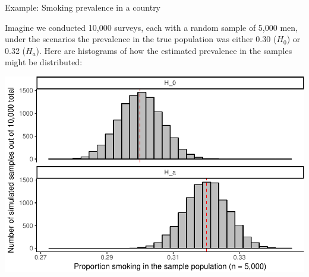 \documentclass[ignorenonframetext,]{beamer}
\begin{document}
\begin{frame}{Example: Smoking prevalence in a country}

Imagine we conducted 10,000 surveys, each with a random sample of 5,000
men, under the scenarios the prevalence in the true population was
either 0.30 (\(H_0\)) or 0.32 (\(H_a\)). Here are histograms of how the
estimated prevalence in the samples might be distributed:

\begin{center}\includegraphics[height=0.6\textheight]{sample_size_files/figure-beamer/unnamed-chunk-1-1} \end{center}

\end{frame}
\end{document}
